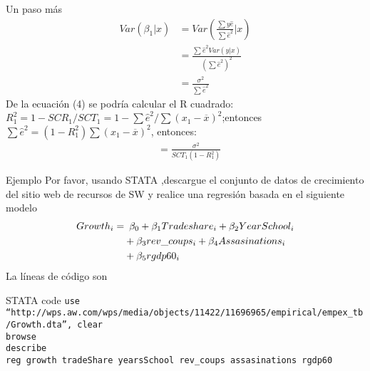 \begin{frame}{Un paso más}
	\begin{align}
		Var(\beta_1|x) & = Var(\frac{\sum y \hat e}{\sum \hat{e}^2}|x) \\
		& = \frac{\sum \hat{e}^2 Var (y|x)}{(\sum \hat e^2)^2} \\
		& = \frac{\sigma^2}{\sum \hat{e}^2}
	\end{align}
	De la ecuación (4) se podría calcular el R cuadrado:\\
	$R^2_1=1-SCR_1/SCT_1=1-\sum \hat{e}^2/\sum (x_1-\overline{x})^2$;entonces\\
	$\sum \hat{e}^2=(1-R_1^2)\sum(x_1-\overline{x})^2$,
	entonces:\\
	\begin{align}
		&= \frac{\sigma^2}{SCT_1(1-R_1^2)}
	\end{align}
\end{frame}	
\begin{frame}{Ejemplo}
	Por favor, usando STATA ,descargue el conjunto de datos de crecimiento del sitio web de recursos de SW y realice una regresión basada en el siguiente modelo
		\begin{align*}
			Growth_i  = & \enskip  \beta_0 + \beta_1Tradeshare_i + \beta_2YearSchool_i\\
			 		 	& + \beta_3rev\_coups_i + \beta_4Assasinations_i \\
					 	& + \beta_5rgdp60_i
		\end{align*}
	La líneas de código son\\
		\begin{Stata code}{STATA code}
			{\tiny
			\texttt{\textcolor{codeblue}{use} \textcolor{codecrimson}{\textquotedblleft http://wps.aw.com/wps/media/objects/11422/11696965/empirical/empex\_tb/Growth.dta\textquotedblright}, clear}\\
			\texttt{\textcolor{codeblue}{browse}}\\
			\texttt{\textcolor{codeblue}{describe}}\\
			\texttt{\textcolor{codeblue}{reg} growth tradeShare yearsSchool rev\_coups assasinations rgdp60}}
		\end{Stata code}
\end{frame}